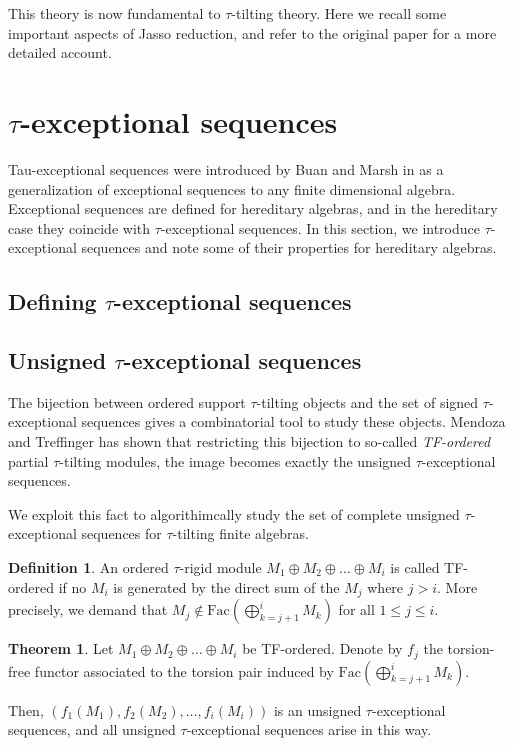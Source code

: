 \documentclass[]{article}
\theoremstyle{definition}
\newtheorem{definition}{Definition}[section]
\newtheorem{theorem}{Theorem}[section]
\newcommand{\tu}{\ensuremath{\tau}}
\begin{document}
This theory is now fundamental to \tu-tilting theory. Here we recall some important aspects of Jasso reduction, and refer to the original paper for a more detailed account.




\section{\tu-exceptional sequences}
Tau-exceptional sequences were introduced by Buan and Marsh in \cite{buantau2020} as a generalization of exceptional sequences to any finite dimensional algebra. Exceptional sequences are defined for hereditary algebras, and in the hereditary case they coincide with \tu-exceptional sequences. In this section, we introduce \tu-exceptional sequences and note some of their properties for hereditary algebras. 

\subsection{Defining \tu-exceptional sequences}

\subsection{Unsigned \tu-exceptional sequences}
The bijection between ordered support \tu-tilting objects and the set of signed \tu-exceptional sequences gives a combinatorial tool to study these objects. Mendoza and Treffinger\cite{mendoza2020stratifying} has shown that restricting this bijection to so-called \textit{TF-ordered } partial \tu-tilting modules, the image becomes exactly the unsigned \tu-exceptional sequences. 

We exploit this fact to algorithimcally study the set of complete unsigned \tu-exceptional sequences for \tu-tilting finite algebras.

\begin{definition}\cite{mendoza2020stratifying}
	An ordered \tu-rigid module $M_1 \oplus M_2 \oplus \dots \oplus M_i$ is called TF-ordered if no $M_i$ is generated by the direct sum of the $M_j$ where $j > i$. More precisely, we demand that $M_j \notin \text{Fac}(\bigoplus_{k = j+1}^i M_k)$ for all $1 \leq j \leq i$.
\end{definition}

\begin{theorem}\cite{mendoza2020stratifying}\label{tf-to-tau}
	Let $M_1 \oplus M_2 \oplus \dots \oplus M_i$ be TF-ordered. Denote by $f_j$ the torsion-free functor associated to the torsion pair induced by $\text{Fac}(\bigoplus_{k = j+1}^i M_k)$.
	
	Then, $(f_1(M_1),f_2(M_2),\dots,f_i(M_i))$ is an unsigned \tu-exceptional sequences, and all unsigned \tu-exceptional sequences arise in this way.
\end{theorem}
\end{document}
